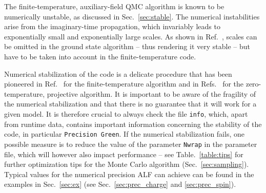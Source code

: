 The finite-temperature, auxiliary-field QMC algorithm is known to be numerically unstable, as discussed in Sec.~\ref{sec:stable}.
The numerical instabilities arise from the imaginary-time propagation, which invariably leads to exponentially small and exponentially large scales.
As shown in Ref.~\cite{Assaad08_rev}, scales can be omitted in the ground state algorithm -- thus rendering it very stable --  but have to be taken into account in the  finite-temperature code.

Numerical stabilization of the code is a delicate procedure that has been pioneered in Ref.~\cite{White89}  for the finite-temperature algorithm and in Refs.~\cite{Sugiyama86,Sorella89} for the zero-temperature, projective algorithm.
It is important to be aware of the fragility of the numerical stabilization and that there is no guarantee that it will work for a given model. It is therefore crucial to always check the file \texttt{info}, which, apart from runtime data, contains important information concerning the stability of the code, in particular \texttt{Precision Green}.
If the numerical stabilization fails, one possible measure is to reduce the value of the parameter \texttt{Nwrap} in the parameter file, which will however also impact performance -- see Table.~\ref{table:tips} for further optimization tips for the Monte Carlo algorithm (Sec.~\ref{sec:sampling}). Typical values for the numerical precision ALF can achieve can be found in the examples in Sec.~\ref{sec:ex} (see Sec.~\ref{sec:prec_charge} and \ref{sec:prec_spin}).

